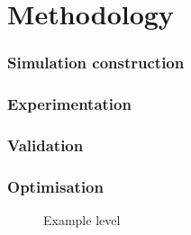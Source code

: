
\chapter{Methodology}


\subsection{Simulation construction}

\subsection{Experimentation}

\subsection{Validation}

\subsection{Optimisation}



\begin{figure}[h!]
  \centering
  
  \caption{\label{fig:examplelev}Example level}
\end{figure}






